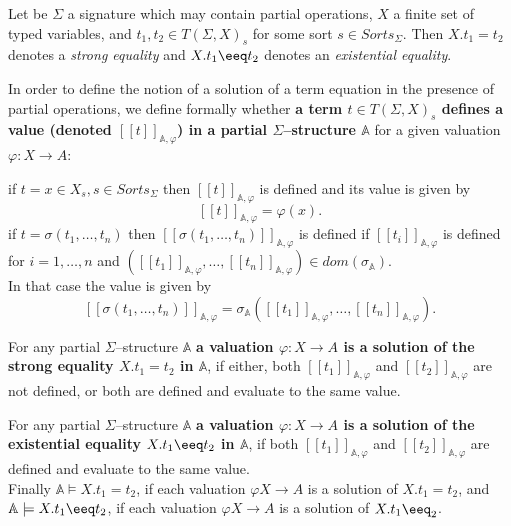 \documentclass[landscape, autoslides, light]{mmiss}
\newcommand{\ekl}{[\![}
\newcommand{\ekr}{]\!]}
\begin{document}
\begin{Package}[Label={FSDPT}, Title={Formal Specification of Data and Process Types}, ShortTitle={FSDPT}, Authors={Horst Reichel}, Date={February 2003}, LevelOfDetail=Lecture, Language=en-GB]
\begin{Section}[Title={Initial Algebras as Data Types}, Label={section3}]
\begin{Section}[Title={Partial Constructors}, Label={section3_5}]
\begin{Paragraph}[Label=Paragraph73]
\end{Paragraph}
\begin{Paragraph}[Title={strong and existential equalities}, Label=Paragraph74]
\small
\begin{Definition}[Title = {Initial Algebras as Data Types}, Label = {Definition3}]
Let be $\Sigma$ a signature which may contain partial operations,
$X$  a finite set of typed variables, and $t_1, t_2 \in T(\Sigma,
X)_s $ for some sort $s \in Sorts_{\Sigma}$. Then $X . t_1 = t_2$
denotes a \emph{strong equality} and $X . t_1 \eeq t_2$ denotes an
\emph{existential equality}.


In order to define the notion of a solution of a term equation in
the presence of partial operations, we define formally whether
\textbf{a term $t \in T(\Sigma, X)_s$ defines a value (denoted
$\ekl t \ekr_{ \mathbb{A}, \varphi}$) in a partial
$\Sigma$--structure $ \mathbb{A}$} for a given valuation $\varphi
: X \to A$:
\begin{List}[ListType=enumerate]
  \ListItem if $t= x \in X_s, s \in Sorts_{\Sigma}$ then  $\ekl t \ekr_{
  \mathbb{A}, \varphi}$ is defined and its value is given by $$\ekl t
  \ekr_{\mathbb{A}, \varphi} = \varphi(x).$$ \pause
  \ListItem if $t = \sigma (t_1, \ldots , t_n)$ then $\ekl \sigma (t_1, \ldots ,
  t_n) \ekr_{ \mathbb{A}, \varphi}$ is defined if $\ekl t_i \ekr_{\mathbb{A},
  \varphi}$ is defined for $i = 1, \ldots , n$ and $(\ekl t_1
  \ekr_{\mathbb{A}, \varphi}, \ldots, \ekl t_n \ekr_{\mathbb{A},
  \varphi}) \in dom(\sigma_{ \mathbb{A}})$. \\ In that case the value
  is given by $$\ekl \sigma (t_1, \ldots ,
  t_n) \ekr_{ \mathbb{A}, \varphi} = \sigma_{ \mathbb{A}}(\ekl t_1
  \ekr_{\mathbb{A}, \varphi}, \ldots, \ekl t_n \ekr_{\mathbb{A},
  \varphi}).$$
\end{List}

For any partial $\Sigma$--structure $ \mathbb{A}$ \textbf{a
valuation $\varphi : X \to A$ is a solution of the strong equality
$X . t_1 = t_2$ in $ \mathbb{A}$}, if either, both $\ekl t_1
\ekr_{\mathbb{A},\varphi} $ and $\ekl t_2
\ekr_{\mathbb{A},\varphi} $ are not defined, or both are defined
and evaluate to the same value.

For any partial $\Sigma$--structure $ \mathbb{A}$ \textbf{a
valuation $\varphi : X \to A$ is a solution of the existential
equality $X . t_1 \eeq t_2$ in $ \mathbb{A}$}, if  both $\ekl t_1
\ekr_{\mathbb{A},\varphi} $ and $\ekl t_2
\ekr_{\mathbb{A},\varphi} $  are defined and evaluate to the same
value.\\
 Finally $ \mathbb{A} \models X . t_1 = t_2$, if each valuation
 $\varphi X \to A$ is a solution of $X . t_1 = t_2$, and
$ \mathbb{A} \models X . t_1 \eeq t_2$, if each valuation
 $\varphi X \to A$ is a solution of $X . t_1 \eeq_2$.


\end{Definition}
\end{Paragraph}
\end{Section}
\end{Section}
\end{Package}
\end{document}
